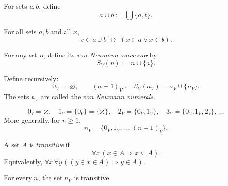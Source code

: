 \begin{definition}
\label{def:binary-union}
For sets $a,b$, define
\[
a\cup b := \bigcup\{a,b\}.
\]
\end{definition}

\begin{proposition}
\label{prop:union-basics}
For all sets $a,b$ and all $x$,
\[
x\in a\cup b\ \leftrightarrow\ (x\in a \lor x\in b).
\]
\end{proposition}




\begin{definition}
\label{def:vn-successor}
For any set $n$, define its \emph{von Neumann successor} by
\[
S_V(n) := n \cup \{n\}.
\]
\end{definition}

\begin{definition}
\label{def:vn-numerals}
Define recursively:
\[
0_V := \varnothing,\qquad (n+1)_V := S_V(n_V)=n_V\cup\{n_V\}.
\]
The sets $n_V$ are called the \emph{von Neumann numerals}.
\end{definition}

\begin{proposition}
\label{prop:vn-first-few}
\[
0_V=\varnothing,\quad
1_V=\{0_V\}=\{\varnothing\},\quad
2_V=\{0_V,1_V\},\quad
3_V=\{0_V,1_V,2_V\},\ \dots
\]
More generally, for $n\ge 1$,
\[
n_V=\{0_V,1_V,\dots,(n-1)_V\}.
\]
\end{proposition}



\begin{definition}
\label{def:transitive-set}
A set $A$ is \emph{transitive} if
\[
\forall x\,(x\in A \Rightarrow x\subseteq A).
\]
Equivalently, $\forall x\,\forall y\,((y\in x\in A)\Rightarrow y\in A)$.
\end{definition}

\begin{proposition}
\label{prop:vn-transitive}
For every $n$, the set $n_V$ is transitive.
\end{proposition}



